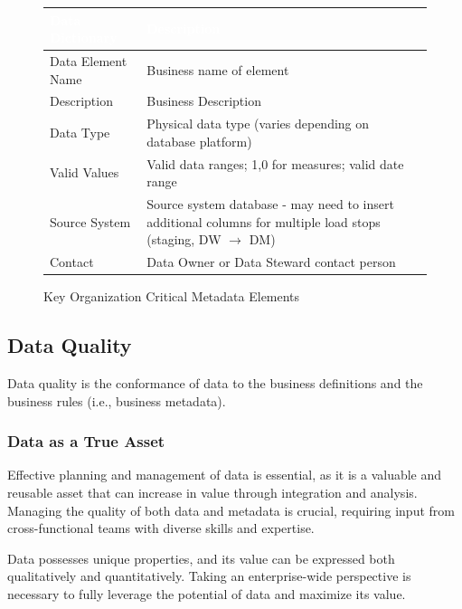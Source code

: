 \begin{figure}[H]
\begin{center}
    \renewcommand{\arraystretch}{1.5}
    \begin{tabular}{|>{\raggedright\arraybackslash}m{3.5cm}
                    |>{\raggedright\arraybackslash}m{11cm}
                    |}
    \hline
    \rowcolor[HTML]{196fb4}\centering\textcolor{white}{\large Data Dictionary} 
                            & \centering\textcolor{white}{\large Description}
                            \tabularnewline 
    \hline
    Data Element Name & Business name of element \\\hline
    Description & Business Description \\\hline
    Data Type & Physical data type (varies depending on database platform) \\\hline
    Valid Values & Valid data ranges; 1,0 for measures; valid date range \\\hline
    Source System & Source system database - may need to insert additional columns for multiple load stops (staging, DW $\rightarrow$ DM) \\\hline
    Contact & Data Owner or Data Steward contact person \\\hline
    \end{tabular}
\end{center}
\caption{Key Organization Critical Metadata Elements}
\label{Data Dictionary}
\end{figure}

\subsection{Data Quality}
Data quality is the conformance of data to the business definitions and the business rules (i.e., business metadata).

\subsubsection{Data as a True Asset}
Effective planning and management of data is essential, as it is a valuable and reusable asset that can increase in value through integration and analysis. Managing the quality of both data and metadata is crucial, requiring input from cross-functional teams with diverse skills and expertise. 

Data possesses unique properties, and its value can be expressed both qualitatively and quantitatively. Taking an enterprise-wide perspective is necessary to fully leverage the potential of data and maximize its value.

